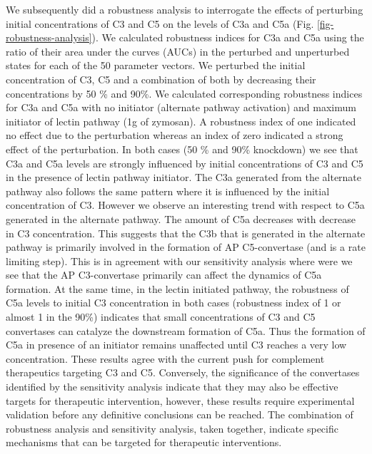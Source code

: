 \documentclass[12pt]{article}
\begin{document}
We subsequently did a robustness analysis to interrogate the effects of perturbing initial concentrations of C3 and C5 on the levels of C3a and C5a (Fig. \ref{fig-robustness-analysis}).
We calculated robustness indices for C3a and C5a using the ratio of their area under the curves (AUCs) in the perturbed and unperturbed states for each of the 50 parameter vectors. We perturbed the initial concentration of C3, C5 and a combination of both by decreasing their concentrations by 50 \% and 90\%. We calculated corresponding robustness indices for C3a and C5a with no initiator (alternate pathway activation) and maximum initiator of lectin pathway (1g of zymosan).  A robustness index of one indicated no effect due to the perturbation whereas an index of zero indicated a strong effect of the perturbation. In both cases (50 \% and 90\% knockdown) we see that C3a and C5a levels are strongly influenced by initial concentrations of C3 and C5 in the presence of lectin pathway initiator. The C3a generated from the alternate pathway also follows the same pattern where it is influenced by the initial concentration of C3. However we observe an interesting trend with respect to C5a generated in the alternate pathway. The amount of C5a decreases with decrease in C3 concentration. This suggests that the C3b that is generated in the alternate pathway is primarily involved in the formation of AP C5-convertase (and is a rate limiting step). This is in agreement with our sensitivity analysis where were we see that the AP C3-convertase primarily can affect the dynamics of C5a formation. At the same time, in the lectin initiated pathway, the robustness of C5a levels to initial C3 concentration in both cases (robustness index of 1 or almost 1 in the 90\%) indicates that small concentrations of C3 and C5 convertases can catalyze the downstream formation of C5a. Thus the formation of C5a in presence of an initiator remains unaffected until C3 reaches a very low concentration. These results agree with the current push for complement therapeutics targeting C3 and C5. Conversely, the significance of the convertases identified by the sensitivity analysis indicate that they may also be effective targets for therapeutic intervention, however, these results require experimental validation before any definitive conclusions can be reached.
The combination of robustness analysis and sensitivity analysis, taken together, indicate specific mechanisms that can be targeted for therapeutic interventions.

\end{document}
